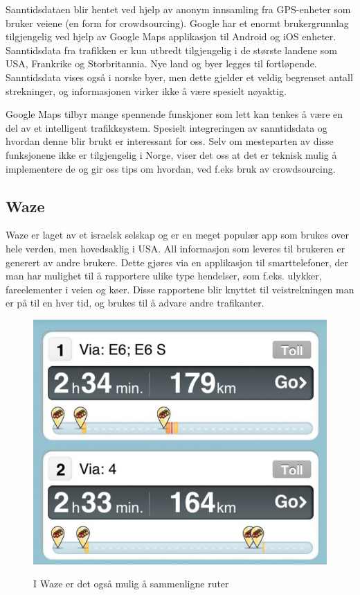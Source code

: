 \documentclass[a4paper,norsk,oneside]{book}
\begin{document}

Sanntidsdataen blir hentet ved hjelp av anonym innsamling fra GPS-enheter som bruker veiene (en form for crowdsourcing). Google har et enormt brukergrunnlag tilgjengelig ved hjelp av Google Maps applikasjon til Android og iOS enheter. Sanntidsdata fra trafikken er kun utbredt tilgjengelig i de største landene som USA, Frankrike og Storbritannia. Nye land og byer legges til fortløpende. Sanntidsdata vises også i norske byer, men dette gjelder et veldig begrenset antall strekninger, og informasjonen virker ikke å være spesielt nøyaktig.

Google Maps tilbyr mange spennende funskjoner som lett kan tenkes å være en del av et intelligent trafikksystem. Spesielt integreringen av sanntidsdata og hvordan denne blir brukt er interessant for oss. Selv om mesteparten av disse funksjonene ikke er tilgjengelig i Norge, viser det oss at det er teknisk mulig å implementere de og gir oss tips om hvordan, ved f.eks bruk av crowdsourcing.

\subsection{Waze}
Waze er laget av et israelsk selskap og er en meget populær app som brukes over hele verden, men hovedsaklig i USA. All informasjon som leveres til brukeren er generert av andre brukere. Dette gjøres via en applikasjon til smarttelefoner, der man har mulighet til å rapportere ulike type hendelser, som f.eks. ulykker, fareelementer i veien og køer. Disse rapportene blir knyttet til veistrekningen man er på til en hver tid, og brukes til å advare andre trafikanter. 

\begin{figure}[H]
\centering
\includegraphics[scale=0.4]{figs/waze1.png}
\label{waze1}
\caption{I Waze er det også mulig å sammenligne ruter}
\end{figure}
\end{document}
